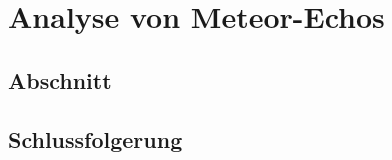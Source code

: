 %
%
%
\chapter{Analyse von Meteor-Echos\label{chapter:meteor}}
\begin{refsection}

\section{Abschnitt}

\section{Schlussfolgerung}

\printbibliography[heading=subbibliography]
\end{refsection}
